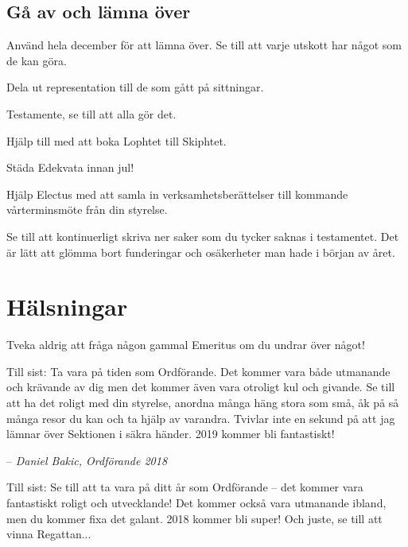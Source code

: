 \documentclass[10pt]{article}
\begin{document}
    \subsection{Gå av och lämna över}
    
    \begin{dashlist}
        \item Använd hela december för att lämna över. Se till att varje utskott har något som de kan göra.
        \item Dela ut representation till de som gått på sittningar.
        \item Testamente, se till att alla gör det.
        \item Hjälp till med att boka Lophtet till Skiphtet.
        \item Städa Edekvata innan jul!
        \item Hjälp Electus med att samla in verksamhetsberättelser till kommande vårterminsmöte från din styrelse.
        \item Se till att kontinuerligt skriva ner saker som du tycker saknas i testamentet. Det är lätt att glömma bort funderingar och osäkerheter man hade i början av året.
    \end{dashlist}
    
    \newpage
    
    \section{Hälsningar}
    
    Tveka aldrig att fråga någon gammal Emeritus om du undrar över något!
    
    \vspace{1ex}

    Till sist: Ta vara på tiden som Ordförande. Det kommer vara både utmanande och krävande av dig men det kommer även vara otroligt kul och givande. Se till att ha det roligt med din styrelse, anordna många häng stora som små, åk på så många resor du kan och ta hjälp av varandra. Tvivlar inte en sekund på att jag lämnar över Sektionen i säkra händer. 2019 kommer bli fantastiskt!

    -- \emph{Daniel Bakic, Ordförande 2018}
    \vspace*{1ex}
    
    Till sist: Se till att ta vara på ditt år som Ordförande -- det kommer vara fantastiskt roligt och utvecklande! Det kommer också vara utmanande ibland, men du kommer fixa det galant. 2018 kommer bli super! Och juste, se till att vinna Regattan...
    
\end{document}
